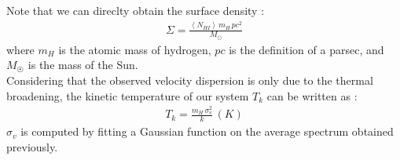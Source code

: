 \documentclass[a4paper,10.5pt]{report}
\begin{document}
\noindent Note that we can direclty obtain the surface density :
\begin{align}
  \Sigma = \frac{\left<N_{HI}\right> \, m_H \, pc^2}{M_\odot}
\end{align}
where $m_H$ is the atomic mass of hydrogen, $pc$ is the definition of a parsec,
and $M_{\astrosun}$ is the mass of the Sun. \\

Considering that the observed velocity dispersion is only due to the thermal broadening, the kinetic temperature
of our system $T_k$ can be written as :
\begin{align}
  T_k = \frac{m_H \, \sigma_v^2}{k} \, (K)
\end{align}
$\sigma_v$ is computed by fitting a Gaussian function on the average spectrum obtained previously.

\newpage
\end{document}

